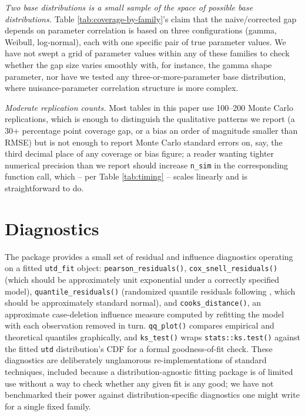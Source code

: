 \emph{Two base distributions is a small sample of the space of
possible base distributions.} Table \ref{tab:coverage-by-family}'s
claim that the naive/corrected gap depends on parameter correlation is
based on three configurations (gamma, Weibull, log-normal), each with
one specific pair of true parameter values. We have not swept a grid of
parameter values within any of these families to check whether the gap
size varies smoothly with, for instance, the gamma shape parameter, nor
have we tested any three-or-more-parameter base distribution, where
nuisance-parameter correlation structure is more complex.

\emph{Moderate replication counts.} Most tables in this paper use
100--200 Monte Carlo replications, which is enough to distinguish the
qualitative patterns we report (a 30+ percentage point coverage gap, or
a bias an order of magnitude smaller than RMSE) but is not enough to
report Monte Carlo standard errors on, say, the third decimal place of
any coverage or bias figure; a reader wanting tighter numerical
precision than we report should increase \texttt{n\_sim} in the
corresponding function call, which -- per Table \ref{tab:timing} --
scales linearly and is straightforward to do.



\section{Diagnostics}
\label{sec:diagnostics}

The package provides a small set of residual and influence diagnostics
operating on a fitted \texttt{utd\_fit} object: \texttt{pearson\_residuals()},
\texttt{cox\_snell\_residuals()} (which should be approximately unit
exponential under a correctly specified model), \texttt{quantile\_residuals()}
(randomized quantile residuals following \citet{dunnsmyth1996}, which
should be approximately standard normal), and \texttt{cooks\_distance()},
an approximate case-deletion influence measure computed by refitting
the model with each observation removed in turn. \texttt{qq\_plot()}
compares empirical and theoretical quantiles graphically, and
\texttt{ks\_test()} wraps \texttt{stats::ks.test()} against the fitted
\texttt{utd} distribution's CDF for a formal goodness-of-fit check.
These diagnostics are deliberately unglamorous re-implementations of
standard techniques, included because a distribution-agnostic fitting
package is of limited use without a way to check whether any given fit
is any good; we have not benchmarked their power against
distribution-specific diagnostics one might write for a single fixed
family.

